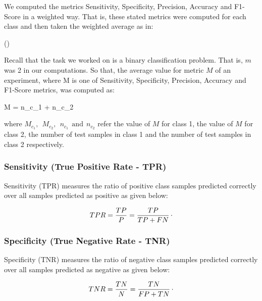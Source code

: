 We computed the metrics Sensitivity, Specificity, Precision, Accuracy and F1-Score in a weighted way. That is, these stated metrics were computed for each class and then taken the weighted average as in:

\be
\label{eq:weighted_avg_metric}
 {()} \:\: 
\ee

Recall that the task we worked on is a binary classification problem. That is, $m$ was 2 in our computations. So that, the average value for metric $M$ of an experiment, where M is one of Sensitivity, Specificity, Precision, Accuracy and F1-Score metrics, was computed as:

\be
\label{eq:weighted_avg_binary_class_metric}
M =  {n_{c_{1}} + n_{c_{2}}} \:\: \raisepunct{,}
\ee

where $M_{c_{1}},\:\:M_{c_{2}},\:\:n_{c_{1}}\:\:\text{and}\:\:n_{c_{2}}$ refer the value of $M$ for class 1, the value of $M$ for class 2, the number of test samples in class 1 and the number of test samples in class 2 respectively.

\subsubsection{Sensitivity (True Positive Rate - TPR)}

Sensitivity (TPR) measures the ratio of positive class samples predicted correctly over all samples predicted as positive as given below:

\begin{equation}
	\label{eq:TPR}
	TPR = \frac{TP}{P} = \frac{TP}{TP + FN}\raisepunct{.}
\end{equation}

\subsubsection{Specificity (True Negative Rate - TNR)}

Specificity (TNR) measures the ratio of negative class samples predicted correctly over all samples predicted as negative as given below:

\begin{equation}
	\label{eq:TNR}
	TNR = \frac{TN}{N} = \frac{TN}{FP + TN}\raisepunct{.}
\end{equation}

